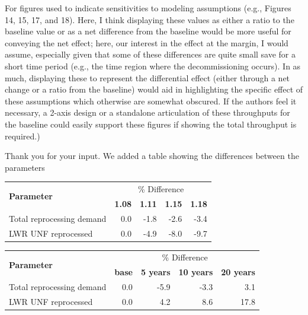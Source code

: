 \documentclass[answers,11pt]{exam}
\begin{document}
\begin{questions}
        \question For figures used to indicate sensitivities to modeling 
        assumptions (e.g., Figures 14, 15, 17, and 18). Here, I think 
        displaying these values as either a ratio to the baseline value or as a 
        net difference from the baseline would be more useful for conveying the 
        net effect; here, our interest in the effect at the margin, I would 
        assume, especially given that some of these differences are quite small 
        save for a short time period (e.g., the time region where the 
        decommissioning occurs). In as much, displaying these to represent the 
        differential effect (either through a net change or a ratio from the 
        baseline) would aid in highlighting the specific effect of these 
        assumptions which otherwise are somewhat obscured. If the authors feel 
        it necessary, a 2-axis design or a standalone articulation of these 
        throughputs for the baseline could easily support these figures if 
        showing the total throughput is required.)

        \begin{solution}
                Thank you for your input. We added a table showing the 
                differences between the parameters
                
                
                \begin{tabular}{lrrrr}
                	\hline
                	\multirow{2}{*}{\textbf{Parameter}} & \multicolumn{4}{c}{\% Difference} \\
                	& \textbf{1.08}& \textbf{1.11} & \textbf{1.15} & \textbf{1.18} \\
                	\hline
                	Total reprocessing demand & 0.0 & -1.8 & -2.6 & -3.4 \\ 
                	LWR UNF reprocessed & 0.0  & -4.9 & -8.0 & -9.7 \\
                	\hline
                \end{tabular}
                
                	\begin{tabular}{lrrrr}
                		\hline
                		\multirow{2}{*}{\textbf{Parameter}} & \multicolumn{4}{c}{\% Difference} \\
                		& \textbf{base}& \textbf{5 years} & \textbf{10 years} & \textbf{20 years} \\
                		\hline
                		Total reprocessing demand & 0.0 & -5.9 & -3.3 & 3.1 \\
                		LWR UNF reprocessed & 0.0  & 4.2 & 8.6 & 17.8 \\
                		\hline
                	\end{tabular}
                

\end{solution}
\end{questions}
\end{document}
